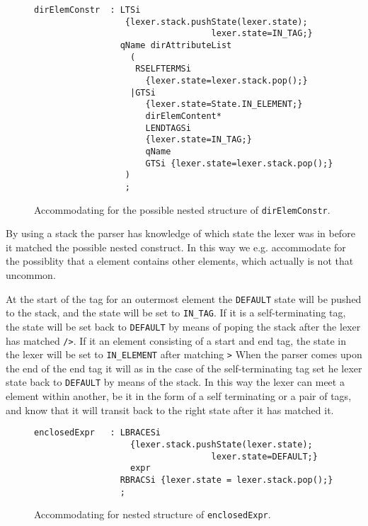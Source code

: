 \begin{figure}[h!]
\begin{verbatim}
dirElemConstr  : LTSi 
                  {lexer.stack.pushState(lexer.state); 
                                   lexer.state=IN_TAG;}
                 qName dirAttributeList
                   (
                    RSELFTERMSi
                      {lexer.state=lexer.stack.pop();}
                   |GTSi 
                      {lexer.state=State.IN_ELEMENT;}
                      dirElemContent* 
                      LENDTAGSi 
                      {lexer.state=IN_TAG;}
                      qName 
                      GTSi {lexer.state=lexer.stack.pop();}
                  )
                  ;
\end{verbatim}
\caption[Accommodating for a nested structure of \texttt{dirElemConstr}]{Accommodating for the possible nested structure of \texttt{dirElemConstr}.}
\label{fig:nestedTransitionElement}
\end{figure}

By using a stack the parser has knowledge of which state the lexer was in before it matched the possible nested construct. In this way we e.g. accommodate for the possiblity that a element contains other elements, which actually is not that uncommon. 

At the start of the tag for an outermost element the \verb!DEFAULT! state will be pushed to the stack, and the state will be set to \verb!IN_TAG!. If it is a self-terminating tag, the state will be set back to \verb!DEFAULT! by means of poping the stack after the lexer has matched \verb!/>!. If it an element consisting of a start and end tag, the state in the lexer will be set to \verb!IN_ELEMENT! after matching \verb!>! When the parser comes upon the end of the end tag it will as in the case of the self-terminating tag set he lexer state back to \verb!DEFAULT! by means of the stack. In this way the lexer can meet a element within another, be it in the form of a self terminating or a pair of tags, and know that it will transit back to the right state after it has matched it.

\begin{figure}[h!]
\begin{verbatim}
enclosedExpr   : LBRACESi 
                   {lexer.stack.pushState(lexer.state); 
                                   lexer.state=DEFAULT;}
                   expr 
                 RBRACSi {lexer.state = lexer.stack.pop();}
                 ;
\end{verbatim}
\caption[Accommodating for nested structure of \texttt{enclosedExpr}]{Accommodating for nested structure of \texttt{enclosedExpr}.}
\label{fig:nestedTransitionExpr}
\end{figure}


